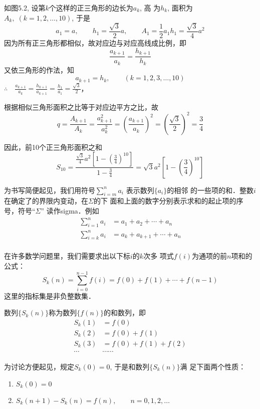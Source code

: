 \begin{solution}
    如图5.2, 设第$k$个这样的正三角形的边长为$a_k$, 高
    为$h_k$, 面积为$A_k,\; (k=1,2,\ldots,10)$, 于是
\[a_1=a,\qquad h_1=\frac{\sqrt{3}}{2}a,\qquad A_1=\frac{1}{2}a_1h_1=\frac{\sqrt{3}}{4}a^2\]
    因为所有正三角形都相似，故对应边与对应高线成比例，即
\[\frac{a_{k+1}}{a_{k}}=\frac{h_{k+1}}{h_k}\]
又依三角形的作法，知
\[a_{k+1}=h_k,\qquad (k=1,2,3,\ldots,10)\]
$\therefore\quad \frac{a_{k+1}}{a_{k}}=\frac{h_{k+1}}{a_{k+1}}=\frac{h_1}{a_1}=\frac{\sqrt{3}}{2}$，

根据相似三角形面积之比等于对应边平方之比，故
\[q=\frac{A_{k+1}}{A_k}=\frac{a^2_{k+1}}{a^2_k}=\left(\frac{a_{k+1}}{a_k}\right)^2=\left(\frac{\sqrt{3}}{2}\right)^2=\frac{3}{4}\]

因此，前10个正三角形面积之和
\[S_{10}=\frac{\frac{\sqrt{3}}{4}a^2\left[1-\left(\frac{3}{4}\right)^{10}\right]}{1-\frac{3}{4}}=\sqrt{3}a^2\left[1-\left(\frac{3}{4}\right)^{10}\right]\]
\end{solution}

为书写简便起见，我们用符号$\displaystyle\sum^n_{i=m}a_i$
表示数列$\{a_i\}$的相邻
的一些项的和．整数$i$在确定了的界限内变动，在$\Sigma$的下
面和上面的数字分别表示求和的起止项的序号，符号“$\Sigma$”
读作sigma．例如
\[\begin{split}
    \sum^n_{i=1}a_i&=a_1+a_2+\cdots+a_n\\
    \sum^n_{i=k}a_i&=a_k+a_{k+1}+\cdots+a_n\\
\end{split}\]

在许多数学问题里，我们需要求出以下标$i$的$k$次多
项式$f(i)$为通项的前$n$项和的公式：
\[S_k(n)=\sum^{n-1}_{i=0}f(i)=f(0)+f(1)+\cdots+f(n-1)\]
这里的指标集是非负整数集．

数列$\{S_k(n)\}$称为数列$\{f(n)\}$的和数列，即
\[\begin{split}
    S_k(1)&=f(0)\\
    S_k(2)&=f(0)+f(1)\\
    S_k(3)&=f(0)+f(1)+f(2)\\
    \cdots&\cdots\cdots
\end{split}\]

为讨论方便起见，规定$S_k(0)=0$, 于是和数列$\{S_k(n)\}$满
足下面两个性质：
\begin{enumerate}
    \item $S_k(0)=0$
    \item $S_k(n+1)-S_k(n)=f(n),\qquad n=0,1,2,\ldots$
\end{enumerate}


